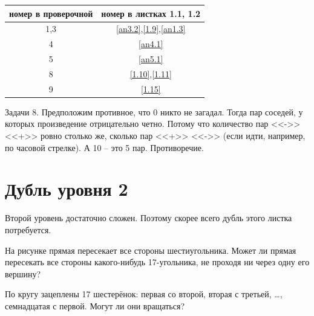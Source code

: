 \begin{table}[h]\centering
	\begin{tabular}{|c|c|}
		\hline
		номер в проверочной&номер в листках 1.1, 1.2\\
		\hline
		1,3&\ref{an3.2},\ref{1.9},\ref{an1.3}\\
		\hline
		4&\ref{an4.1}\\
		\hline
		5&\ref{an5.1}\\
		\hline
		8&\ref{1.10},\ref{1.11}\\
		\hline
		9&\ref{1.15}\\
		\hline
	\end{tabular}
\end{table}
\begin{prf}
	Задачи 8. Предположим противное, что 0 никто не загадал. Тогда пар соседей, у которых произведение отрицательно четно. Потому что количество пар <<->> <<+>> ровно столько же, сколько пар <<+>> <<->> (если идти, например, по часовой стрелке). А 10 -- это 5 пар. Противоречие.
\end{prf}

\section{Дубль уровня 2}

Второй уровень достаточно сложен. Поэтому скорее всего дубль этого листка потребуется.



\begin{thm}
	\label{f1}
	На рисунке прямая пересекает все стороны шестиугольника. Может ли прямая пересекать все стороны какого-нибудь 17-угольника, не проходя ни через одну его вершину?
\end{thm}


\begin{thm}
	По кругу зацеплены 17 шестерёнок: первая со второй, вторая с третьей, \dots, семнадцатая с первой. Могут ли они вращаться?
\end{thm}

